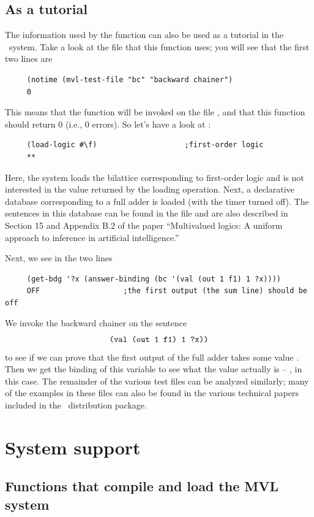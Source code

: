 \subsection{As a tutorial}

The information used by the function  can also be used
as a tutorial in the \mvl\ system.  Take a look at the file
 that this function uses; you will see that the first
two lines are
 \begin{verbatim}
     (notime (mvl-test-file "bc" "backward chainer")
     0
\end{verbatim}
 This means that the function  will be invoked on
the file , and that this function should return 0
(i.e., 0 errors).  So let's have a look at :
 \begin{verbatim}
     (load-logic #\f)                    ;first-order logic
     **
\end{verbatim}
 Here, the system loads the bilattice corresponding to first-order
logic and is not interested in the value returned by the loading
operation.  Next, a declarative database corresponding to a full
adder is loaded (with the timer turned off).  The sentences in this
database can be found in the file  and are also
described in Section 15 and Appendix B.2 of the paper ``Multivalued
logics: A uniform approach to inference in artificial intelligence.''

Next, we see in  the two lines
 \begin{verbatim}
     (get-bdg '?x (answer-binding (bc '(val (out 1 f1) 1 ?x))))
     OFF                   ;the first output (the sum line) should be off
\end{verbatim}
 We invoke the backward chainer on the sentence
 \[\mbox{\tt (val (out 1 f1) 1 ?x))}\]
 to see if we can prove that the first output of the full adder takes
some value .  Then we get the binding of this variable to
see what the value actually is -- , in this case.  The
remainder of the various test files can be analyzed similarly; many
of the examples in these files can also be found in the various
technical papers included in the \mvl\ distribution package.

\section{System support}
\label{s.support}

\subsection{Functions that compile and load the MVL system}

